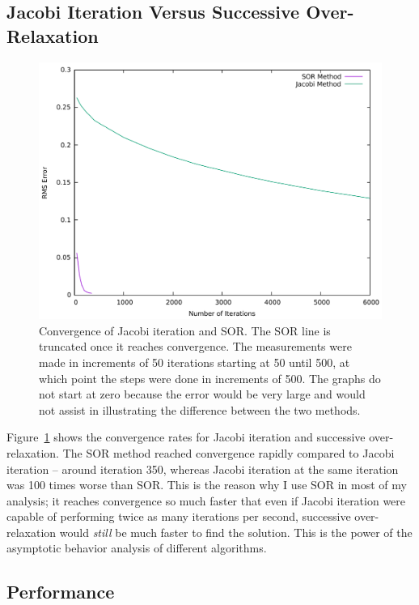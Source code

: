 \subsection{Jacobi Iteration Versus Successive Over-Relaxation}
	\begin{figure}[h!]
	\centering
	\includegraphics[width=1.0\linewidth]{jacsor.pdf}
		\caption[Convergence of Jacobi iteration and SOR.]{Convergence of Jacobi iteration and SOR. The SOR line is truncated once it reaches convergence. The measurements were made in increments of 50 iterations starting at
		50 until 500, at which point the steps were done in increments of 500. The graphs do not start at zero because the error would be very large and would not assist in
		illustrating the difference between the two methods.} \label{fig:jacsor}
	\end{figure}



Figure~\ref{fig:jacsor} shows the convergence rates for Jacobi iteration and successive over-relaxation. The SOR method
reached convergence rapidly compared to Jacobi iteration -- around iteration 350, whereas Jacobi iteration at the
same iteration was 100 times worse than SOR. This is the reason why I use SOR in most of my analysis; it reaches convergence
so much faster that even if Jacobi iteration were capable of performing twice as many iterations per second, successive over-relaxation
would \textit{still} be much faster to find the solution. This is the power of the asymptotic behavior analysis of different algorithms.


\subsection{Performance}


